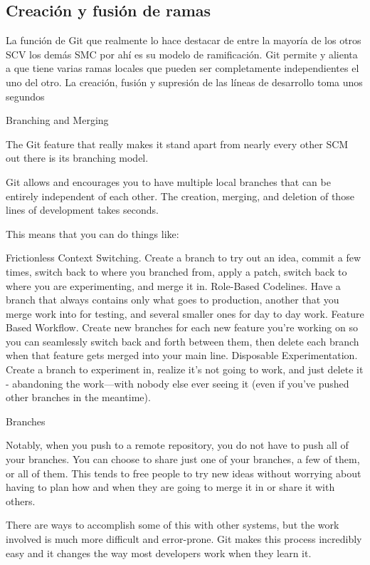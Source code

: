 \documentclass[12pt, spanish, oneside, onecolumn, a4paper]{article}
\begin{document}
\subsection{Creación y fusión de ramas}
\label{sec:branchingandmerging}

La función de Git que realmente lo hace destacar de entre la mayoría de los otros SCV los demás SMC por ahí es su modelo de
ramificación. Git permite y alienta a que tiene varias ramas locales
que pueden ser completamente independientes el uno del otro. La
creación, fusión y supresión de las líneas de desarrollo toma unos
segundos

Branching and Merging

The Git feature that really makes it stand apart from nearly every other SCM out there is its branching model.

Git allows and encourages you to have multiple local branches that can be entirely independent of each other. The creation, merging, and deletion of those lines of development takes seconds.

This means that you can do things like:

    Frictionless Context Switching. Create a branch to try out an idea, commit a few times, switch back to where you branched from, apply a patch, switch back to where you are experimenting, and merge it in.
    Role-Based Codelines. Have a branch that always contains only what goes to production, another that you merge work into for testing, and several smaller ones for day to day work.
    Feature Based Workflow. Create new branches for each new feature you're working on so you can seamlessly switch back and forth between them, then delete each branch when that feature gets merged into your main line.
    Disposable Experimentation. Create a branch to experiment in, realize it's not going to work, and just delete it - abandoning the work—with nobody else ever seeing it (even if you've pushed other branches in the meantime).

Branches

Notably, when you push to a remote repository, you do not have to push all of your branches. You can choose to share just one of your branches, a few of them, or all of them. This tends to free people to try new ideas without worrying about having to plan how and when they are going to merge it in or share it with others.

There are ways to accomplish some of this with other systems, but the work involved is much more difficult and error-prone. Git makes this process incredibly easy and it changes the way most developers work when they learn it. 


\glsaddall
\end{document}
